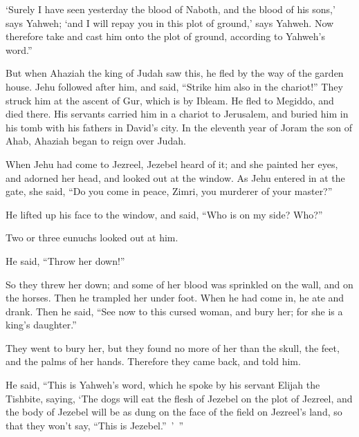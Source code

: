 {‘Surely I have seen yesterday the blood of Naboth, and the blood of his sons,’ says Yahweh; ‘and I will repay you in this plot of ground,’ says Yahweh. Now therefore take and cast him onto the plot of ground, according to Yahweh’s word.”
\par }{\PP {}But when Ahaziah the king of Judah saw this, he fled by the way of the garden house. Jehu followed after him, and said, “Strike him also in the chariot!” They struck him at the ascent of Gur, which is by Ibleam. He fled to Megiddo, and died there.
His servants carried him in a chariot to Jerusalem, and buried him in his tomb with his fathers in David’s city.
In the eleventh year of Joram the son of Ahab, Ahaziah began to reign over Judah.
\par }{\PP {}When Jehu had come to Jezreel, Jezebel heard of it; and she painted her eyes, and adorned her head, and looked out at the window.
As Jehu entered in at the gate, she said, “Do you come in peace, Zimri, you murderer of your master?”
\par }{\PP {}He lifted up his face to the window, and said, “Who is on my side? Who?”
\par }{\PP Two or three eunuchs looked out at him.
\par }{\PP {}He said, “Throw her down!”
\par }{\PP So they threw her down; and some of her blood was sprinkled on the wall, and on the horses. Then he trampled her under foot.
When he had come in, he ate and drank. Then he said, “See now to this cursed woman, and bury her; for she is a king’s daughter.”
\par }{\PP {}They went to bury her, but they found no more of her than the skull, the feet, and the palms of her hands.
Therefore they came back, and told him.
\par }{\PP He said, “This is Yahweh’s word, which he spoke by his servant Elijah the Tishbite, saying, ‘The dogs will eat the flesh of Jezebel on the plot of Jezreel,
and the body of Jezebel will be as dung on the face of the field on Jezreel’s land, so that they won’t say, “This is Jezebel.” ’ ”

}
